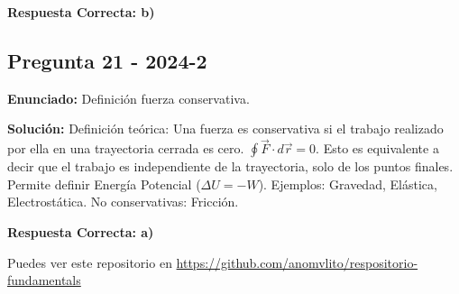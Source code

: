 \documentclass{article}
\begin{document}
\textbf{Respuesta Correcta: b)}

\vspace{0.5cm}

\subsection*{Pregunta 21 - 2024-2}
\textbf{Enunciado:} Definición fuerza conservativa.

\textbf{Solución:}
Definición teórica:
Una fuerza es conservativa si el trabajo realizado por ella en una trayectoria cerrada es cero.
$\oint \vec{F} \cdot d\vec{r} = 0$.
Esto es equivalente a decir que el trabajo es independiente de la trayectoria, solo de los puntos finales.
Permite definir Energía Potencial ($\Delta U = -W$).
Ejemplos: Gravedad, Elástica, Electrostática.
No conservativas: Fricción.

\noindent{}

\textbf{Respuesta Correcta: a)}

\vspace{0.5cm}

\vfill
\begin{center}
    \small Puedes ver este repositorio en \url{https://github.com/anomvlito/respositorio-fundamentals}
\end{center}
\end{document}
